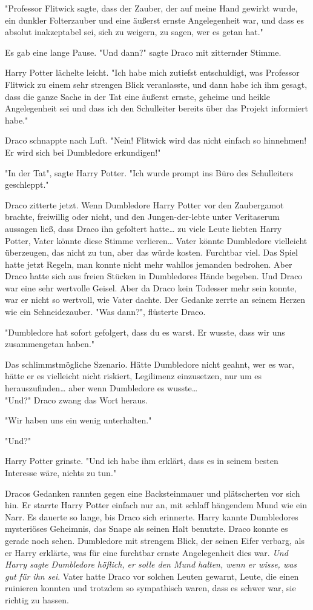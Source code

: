 {"Professor Flitwick sagte, dass der Zauber, der auf meine Hand gewirkt wurde, ein dunkler Folterzauber und eine äußerst ernste Angelegenheit war, und dass es absolut inakzeptabel sei, sich zu weigern, zu sagen, wer es getan hat."

Es gab eine lange Pause. "Und dann?" sagte Draco mit zitternder Stimme.

Harry Potter lächelte leicht. "Ich habe mich zutiefst entschuldigt, was Professor Flitwick zu einem sehr strengen Blick veranlasste, und dann habe ich ihm gesagt, dass die ganze Sache in der Tat eine äußerst ernste, geheime und heikle Angelegenheit sei und dass ich den Schulleiter bereits über das Projekt informiert habe."

Draco schnappte nach Luft. "Nein! Flitwick wird das nicht einfach so hinnehmen! Er wird sich bei Dumbledore erkundigen!"

"In der Tat", sagte Harry Potter. "Ich wurde prompt ins Büro des Schulleiters geschleppt."

Draco zitterte jetzt. Wenn Dumbledore Harry Potter vor den Zaubergamot brachte, freiwillig oder nicht, und den Jungen-der-lebte unter Veritaserum aussagen ließ, dass Draco ihn gefoltert hatte… zu viele Leute liebten Harry Potter, Vater könnte diese Stimme verlieren… Vater könnte Dumbledore vielleicht überzeugen, das nicht zu tun, aber das würde kosten. Furchtbar viel. Das Spiel hatte jetzt Regeln, man konnte nicht mehr wahllos jemanden bedrohen. Aber Draco hatte sich aus freien Stücken in Dumbledores Hände begeben. Und Draco war eine sehr wertvolle Geisel. Aber da Draco kein Todesser mehr sein konnte, war er nicht so wertvoll, wie Vater dachte. Der Gedanke zerrte an seinem Herzen wie ein Schneidezauber. "Was dann?", flüsterte Draco.

"Dumbledore hat sofort gefolgert, dass du es warst. Er wusste, dass wir uns zusammengetan haben."

Das schlimmstmögliche Szenario. Hätte Dumbledore nicht geahnt, wer es war, hätte er es vielleicht nicht riskiert, Legilimenz einzusetzen, nur um es herauszufinden… aber wenn Dumbledore es wusste…\\ "Und?" Draco zwang das Wort heraus.

"Wir haben uns ein wenig unterhalten."

"Und?"

Harry Potter grinste. "Und ich habe ihm erklärt, dass es in seinem besten Interesse wäre, nichts zu tun."

Dracos Gedanken rannten gegen eine Backsteinmauer und plätscherten vor sich hin. Er starrte Harry Potter einfach nur an, mit schlaff hängendem Mund wie ein Narr. Es dauerte so lange, bis Draco sich erinnerte. Harry kannte Dumbledores mysteriöses Geheimnis, das Snape als seinen Halt benutzte. Draco konnte es gerade noch sehen. Dumbledore mit strengem Blick, der seinen Eifer verbarg, als er Harry erklärte, was für eine furchtbar ernste Angelegenheit dies war. \emph{Und Harry sagte Dumbledore höflich, er solle den Mund halten, wenn er wisse, was gut für ihn sei}. Vater hatte Draco vor solchen Leuten gewarnt, Leute, die einen ruinieren konnten und trotzdem so sympathisch waren, dass es schwer war, sie richtig zu hassen.

}
